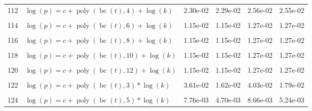 \documentclass[12pt,a4paper]{article}
\DeclareMathOperator{\bc}{bc}
\DeclareMathOperator{\poly}{poly}
\begin{document}
\begin{longtable}[t]{ll>{\raggedleft\arraybackslash}p{2cm}>{\raggedleft\arraybackslash}p{2cm}>{\raggedleft\arraybackslash}p{2cm}>{\raggedleft\arraybackslash}p{2cm}}
112 & $\log(p) = c + \poly\left( \bc(t), 4 \right) + \log(k)$ & 2.30e-02 & 2.29e-02 & 2.56e-02 & 2.55e-02\\
\cellcolor{gray!6}{113} & \cellcolor{gray!6}{$\log(p) = c + \poly\left( \bc(t), 5 \right) + \log(k)$} & \cellcolor{gray!6}{1.47e-02} & \cellcolor{gray!6}{1.28e-02} & \cellcolor{gray!6}{1.64e-02} & \cellcolor{gray!6}{1.41e-02}\\
114 & $\log(p) = c + \poly\left( \bc(t), 6 \right) + \log(k)$ & 1.15e-02 & 1.15e-02 & 1.27e-02 & 1.27e-02\\
\cellcolor{gray!6}{115} & \cellcolor{gray!6}{$\log(p) = c + \poly\left( \bc(t), 7 \right) + \log(k)$} & \cellcolor{gray!6}{1.17e-02} & \cellcolor{gray!6}{1.16e-02} & \cellcolor{gray!6}{1.29e-02} & \cellcolor{gray!6}{1.29e-02}\\
116 & $\log(p) = c + \poly\left( \bc(t), 8 \right) + \log(k)$ & 1.15e-02 & 1.15e-02 & 1.27e-02 & 1.27e-02\\
\cellcolor{gray!6}{117} & \cellcolor{gray!6}{$\log(p) = c + \poly\left( \bc(t), 9 \right) + \log(k)$} & \cellcolor{gray!6}{1.15e-02} & \cellcolor{gray!6}{1.15e-02} & \cellcolor{gray!6}{1.27e-02} & \cellcolor{gray!6}{1.27e-02}\\
118 & $\log(p) = c + \poly\left( \bc(t), 10 \right) + \log(k)$ & 1.15e-02 & 1.15e-02 & 1.27e-02 & 1.27e-02\\
\cellcolor{gray!6}{119} & \cellcolor{gray!6}{$\log(p) = c + \poly\left( \bc(t), 11 \right) + \log(k)$} & \cellcolor{gray!6}{1.15e-02} & \cellcolor{gray!6}{1.15e-02} & \cellcolor{gray!6}{1.27e-02} & \cellcolor{gray!6}{1.27e-02}\\
120 & $\log(p) = c + \poly\left( \bc(t), 12 \right) + \log(k)$ & 1.15e-02 & 1.15e-02 & 1.27e-02 & 1.27e-02\\
\cellcolor{gray!6}{121} & \cellcolor{gray!6}{$\log(p) = c + \poly\left( \bc(t), 13 \right) + \log(k)$} & \cellcolor{gray!6}{1.15e-02} & \cellcolor{gray!6}{1.15e-02} & \cellcolor{gray!6}{1.27e-02} & \cellcolor{gray!6}{1.27e-02}\\
122 & $\log(p) = c + \poly\left( \bc(t), 3 \right) * \log(k)$ & 3.61e-02 & 1.62e-02 & 4.03e-02 & 1.79e-02\\
\cellcolor{gray!6}{123} & \cellcolor{gray!6}{$\log(p) = c + \poly\left( \bc(t), 4 \right) * \log(k)$} & \cellcolor{gray!6}{1.84e-02} & \cellcolor{gray!6}{1.83e-02} & \cellcolor{gray!6}{2.05e-02} & \cellcolor{gray!6}{2.05e-02}\\
124 & $\log(p) = c + \poly\left( \bc(t), 5 \right) * \log(k)$ & 7.76e-03 & 4.70e-03 & 8.66e-03 & 5.24e-03\\

\end{longtable}
\end{document}
